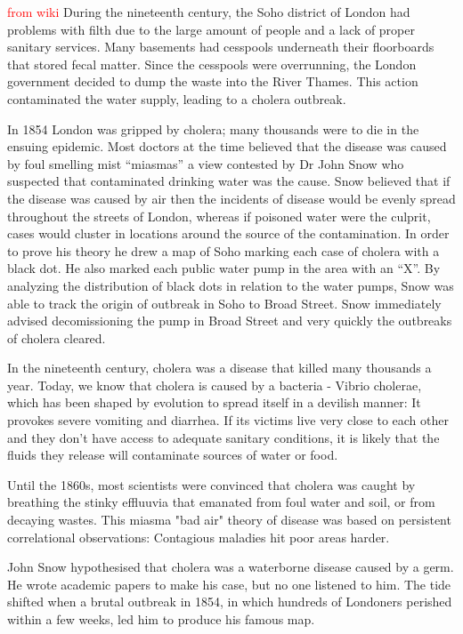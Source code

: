 \documentclass[12pt]{article}
\newcommand\todo[1]{\textcolor{red}{#1}}
\begin{document}
\todo{from wiki}
During the nineteenth century, the Soho district of London had problems with filth due to the large amount of people and a lack of proper sanitary services. Many basements had cesspools underneath their floorboards that stored fecal matter. Since the cesspools were overrunning, the London government decided to dump the waste into the River Thames. This action contaminated the water supply, leading to a cholera outbreak. 

In 1854 London was gripped by cholera; many thousands were to die in the ensuing epidemic. Most doctors at the time believed that the disease was caused by foul smelling mist “miasmas” a view contested by Dr John Snow who suspected that contaminated drinking water was the cause. Snow believed that if the disease was caused by air then the incidents of disease would be evenly spread throughout the streets of London, whereas if poisoned water were the culprit, cases would cluster in locations around the source of the contamination. In order to prove his theory he drew a map of Soho marking each case of cholera with a black dot. He also marked each public water pump in the area with an “X”. By analyzing the distribution of black dots in relation to the water pumps, Snow was able to track the origin of outbreak in Soho to Broad Street. Snow immediately advised decomissioning the pump in Broad Street and very quickly the outbreaks of cholera cleared. \cite{test}

In the nineteenth century, cholera was a disease that killed many thousands a year. Today, we know that cholera is caused by a bacteria - Vibrio cholerae, which has been shaped by evolution to spread itself in a devilish manner: It provokes severe vomiting and diarrhea. If its victims live very close to each other and they don't have access to adequate sanitary conditions, it is likely that the fluids they release will contaminate sources of water or food.

Until the 1860s, most scientists were convinced that cholera was caught by breathing the stinky effluuvia that emanated from foul water and soil, or from decaying wastes. This miasma "bad air" theory of disease was based on persistent correlational observations: Contagious maladies hit poor areas harder. 

John Snow hypothesised that cholera was a waterborne disease caused by a germ. He wrote academic papers to make his case, but no one listened to him. The tide shifted when a brutal outbreak in 1854, in which hundreds of Londoners perished within a few weeks, led him to produce his famous map. \cite{heros}
\end{document}
